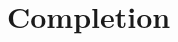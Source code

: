 %
%
%
%
%
%
%

\part{Completion}
\label{completion_heading}
\newpage{\pagestyle{empty}\cleardoublepage}


\newpage{\pagestyle{empty}\cleardoublepage}

\newpage{\pagestyle{empty}\cleardoublepage}

